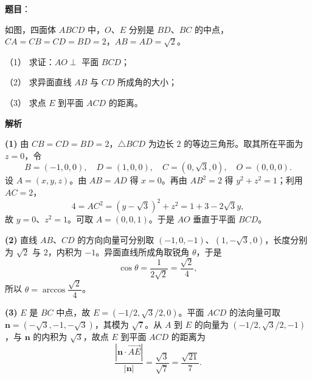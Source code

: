 \begin{answer}

\textbf{题目}：

如图，四面体 $ABCD$ 中，$O$、$E$ 分别是 $BD$、$BC$ 的中点，$CA=CB=CD=BD=2$，$AB=AD=\sqrt{2}$。

（1） 求证：$AO\perp$ 平面 $BCD$；

（2） 求异面直线 $AB$ 与 $CD$ 所成角的大小；

（3） 求点 $E$ 到平面 $ACD$ 的距离。
\nopagebreak[4]
\begin{center}\end{center}
\nopagebreak[4]
\textbf{解析}

\textbf{(1)} 由 $CB=CD=BD=2$，$\triangle BCD$ 为边长 $2$ 的等边三角形。取其所在平面为 $z=0$，令
\nopagebreak[4]
\[
B=(-1,0,0),\quad D=(1,0,0),\quad C=(0,\sqrt3,0),\quad O=(0,0,0).
\]
设 $A=(x,y,z)$。由 $AB=AD$ 得 $x=0$。再由 $AB^2=2$ 得 $y^2+z^2=1$；利用 $AC=2$，
\nopagebreak[4]
\[
4=AC^2=(y-\sqrt3)^2+z^2=1+3-2\sqrt3y,
\]
故 $y=0$、$z^2=1$。可取 $A=(0,0,1)$。于是 $AO$ 垂直于平面 $BCD$。

\textbf{(2)} 直线 $AB$、$CD$ 的方向向量可分别取 $(-1,0,-1)$、$(1,-\sqrt3,0)$，长度分别为 $\sqrt2$ 与 $2$，内积为 $-1$。异面直线所成角取锐角 $\theta$，于是
\nopagebreak[4]
\[
\cos\theta=\frac{1}{2\sqrt2}=\frac{\sqrt2}{4},
\]
所以 $\theta=\arccos\dfrac{\sqrt2}{4}$。

\textbf{(3)} $E$ 是 $BC$ 中点，故 $E=(-1/2,\sqrt3/2,0)$。平面 $ACD$ 的法向量可取 $\mathbf n=(-\sqrt3,-1,-\sqrt3)$，其模为 $\sqrt7$。从 $A$ 到 $E$ 的向量为 $(-1/2,\sqrt3/2,-1)$，与 $\mathbf n$ 的内积为 $\sqrt3$，故点 $E$ 到平面 $ACD$ 的距离为
\nopagebreak[4]
\[
\frac{|\mathbf n\cdot\overrightarrow{AE}|}{|\mathbf n|}
=\frac{\sqrt3}{\sqrt7}=\frac{\sqrt{21}}7.
\]
\nopagebreak[4]
\begin{center}\end{center}
\nopagebreak[4]



\end{answer}
